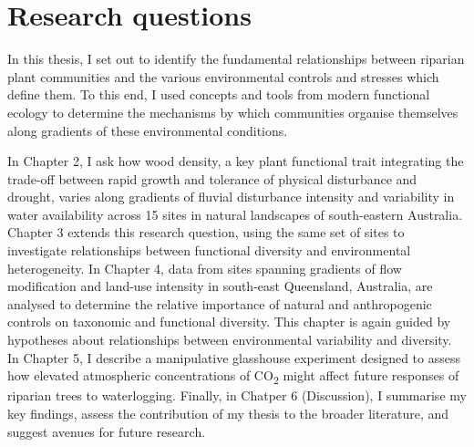 \documentclass[openright,12pt,a4paper]{memoir}
\begin{document}
\section{Research questions}
In this thesis, I set out to identify the fundamental relationships between riparian plant communities and the various environmental controls and stresses which define them. To this end, I used concepts and tools from modern functional ecology to determine the mechanisms by which communities organise themselves along gradients of these environmental conditions.

In Chapter 2, I ask how wood density, a key plant functional trait integrating the trade-off between rapid growth and tolerance of physical disturbance and drought, varies along gradients of fluvial disturbance intensity and variability in water availability across 15 sites in natural landscapes of south-eastern Australia. Chapter 3 extends this research question, using the same set of sites to investigate relationships between functional diversity and environmental heterogeneity. In Chapter 4, data from sites spanning gradients of flow modification and land-use intensity in south-east Queensland, Australia, are analysed to determine the relative importance of natural and anthropogenic controls on taxonomic and functional diversity. This chapter is again guided by hypotheses about relationships between environmental variability and diversity. In Chapter 5, I describe a manipulative glasshouse experiment designed to assess how elevated atmospheric concentrations of CO\textsubscript{2} might affect future responses of riparian trees to waterlogging. Finally, in Chatper 6 (Discussion), I summarise my key findings, assess the contribution of my thesis to the broader literature, and suggest avenues for future research.

\renewcommand\bibname{{References}} 
\begin{small}


\end{small}
\end{document}
